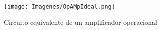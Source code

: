 \documentclass{article}
\begin{document}
\begin{figure}
    \centering
    \texttt{[image: Imagenes/OpAMpIdeal.png]}
    \caption{Circuito equivalente de un amplificador operacional\citep{AmplificadorOperacional}}
    \label{fig:opAmpIdeal}
\end{figure}






 
 
 
 
 
 
 
 

 








\end{document}
